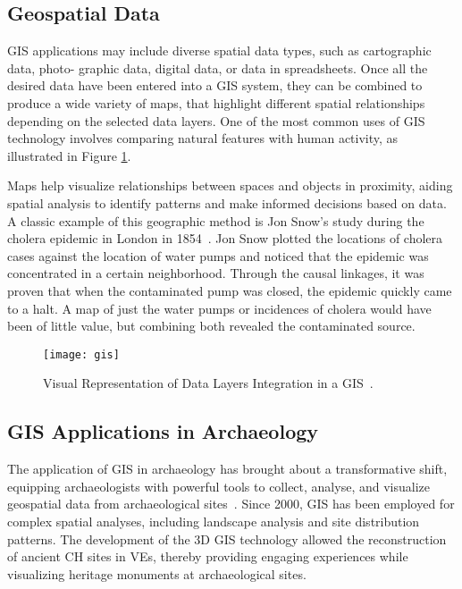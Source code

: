 \subsection{Geospatial Data} 
\label{sub:geospatial_data}

\gls{GIS} applications may include diverse spatial data types, such as cartographic data, photo-
graphic data, digital data, or data in spreadsheets. Once all the desired data have been
entered into a \gls{GIS} system, they can be combined to produce a wide variety of maps,
that highlight different spatial relationships depending on the selected data layers. 
One of the most common uses of
\gls{GIS} technology involves comparing natural features with human activity, as illustrated in Figure \ref{fig:gis}.

Maps help visualize relationships between spaces and objects in proximity, aiding spatial analysis to identify patterns and make informed decisions based on data.
A classic example of this geographic method is Jon Snow's study during the cholera epidemic in London in 1854~\cite{inbook}. Jon Snow plotted the locations of cholera cases against the location of water pumps and noticed that the epidemic was concentrated in a certain neighborhood. 
Through the causal linkages, it was proven that when the contaminated pump was closed, the epidemic quickly came to a halt. 
A map of just the water pumps or incidences of cholera would have been of little value, but combining both revealed the contaminated source. 

\begin{figure}[h!]
    \centering
    \texttt{[image: gis]}
    \caption{Visual Representation of Data Layers Integration in a \gls{GIS}~\cite{gao_data_layers}.}
    \label{fig:gis}
\end{figure}

\subsection{GIS Applications in Archaeology}
\label{sub:gis_archeology}

The application of \gls{GIS} in archaeology has brought about a transformative shift, equipping archaeologists with powerful tools to collect, analyse, 
and visualize geospatial data from archaeological sites~\cite{yao2023overview}. 
Since 2000, \gls{GIS} has been employed for complex spatial analyses, including landscape analysis and site distribution patterns. 
The development of the \gls{3D} \gls{GIS} technology allowed the reconstruction of ancient \gls{CH} sites in \glspl{VE}, thereby providing engaging experiences while visualizing heritage monuments at archaeological sites.

